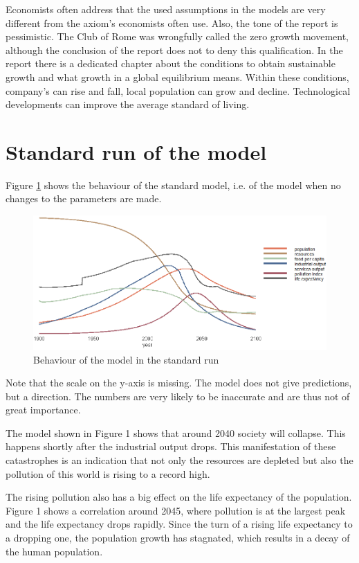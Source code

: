 \documentclass[10pt,a4paper]{scrartcl}
\begin{document}
Economists often address that the used assumptions in the models are very different from the axiom's economists often use. Also, the tone of the report is pessimistic. The Club of Rome was wrongfully called the zero growth movement, although the conclusion of the report does not to deny this qualification. In the report there is a dedicated chapter about the conditions to obtain sustainable growth and what growth in a global equilibrium means. Within these conditions, company's can rise and fall, local population can grow and decline. Technological developments can improve the average standard of living.

\section*{Standard run of the model}

Figure \ref{standard-run} shows the behaviour of the standard model, i.e. of the model when no changes to the parameters are made.

\begin{figure}
\centering
\includegraphics[width=\textwidth]{./plaatjes/standard-run.png}
\caption{Behaviour of the model in the standard run}
\label{standard-run}
\end{figure}

Note that the scale on the y-axis is missing. The model does not give predictions, but a direction. The numbers are very likely to be inaccurate and are thus not of great importance.

The model shown in Figure 1 shows that around 2040 society will collapse. This happens shortly after the industrial output drops. This manifestation of these catastrophes is an indication that not only the resources are depleted but also the pollution of this world is rising to a record high.

The rising pollution also has a big effect on the life expectancy of the population. Figure 1 shows a correlation around 2045, where pollution is at the largest peak and the life expectancy drops rapidly. Since the turn of a rising life expectancy to a dropping one, the population growth has stagnated, which results in a decay of the human population.
\end{document}
